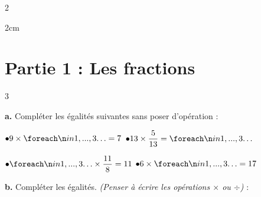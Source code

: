 \documentclass[a4paper]{book}
\begin{document}
{\begin{exerciceNote}{2}
\begin{minipage}[c]{0.48\textwidth}
\begin{center}
            \end{center}
            \vspace{0.2cm}
            \begin{ZoneReponse}{2cm}
            \end{ZoneReponse}
        \end{minipage}
    \end{exerciceNote}
    
    
\newpage
\setcounter{exo}{0}
\NomPrenom
{}

\TableauCompetencesQuatre
    {} %
    {} %
    {} %
    {} %

    \section*{Partie 1 : Les fractions}
    
    \begin{exerciceNote}{3}        
        \begin{minipage}[t]{0.46\textwidth}
            \textbf{a.} Compléter les égalités suivantes sans poser d'opération :
            
            $\bullet 9 \times \points[3] = 7$ \hspace{1.5cm} $\bullet 13 \times \dfrac{5}{13} = \points[3]$
            \vspace{0.4cm}
        
            $\bullet \points[3] \times \dfrac{11}{8} = 11$ \hspace{1cm} $\bullet 6 \times \points[3] = 17$
        \end{minipage}
        \hfill\vrule\hfill 
        \begin{minipage}[t]{0.46\textwidth}
            \textbf{b.} Compléter les égalités. \textit{(Penser à écrire les opérations $\times$ ou $\div$)} :
            

\end{minipage}
\end{exerciceNote}}
\end{document}
